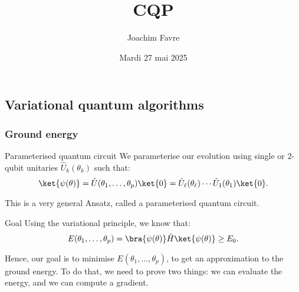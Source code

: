 \documentclass[a4paper]{article}
\title{CQP}
\author{Joachim Favre}
\date{Mardi 27 mai 2025}
\begin{document}
\maketitle


\subsection{Variational quantum algorithms}

\subsubsection{Ground energy}

\begin{parag}{Parameterised quantum circuit}
    We parameterise our evolution using single or 2-qubit unitaries $\hat{U}_k\left(\theta_k\right)$ such that: 
    \[\ket{\psi\left(\theta\right)} = \hat{U}\left(\theta_1, \ldots, \theta_p\right) \ket{0} = \hat{U}_{\ell}\left(\theta_{\ell}\right) \cdots \hat{U}_1\left(\theta_1\right) \ket{0}.\]

    This is a very general Ansatz, called a parameterised quantum circuit.
\end{parag}

\begin{parag}{Goal}
    Using the variational principle, we know that: 
    \[E\left(\theta_1, \ldots, \theta_p\right) = \bra{\psi\left(\theta\right)} \hat{H} \ket{\psi\left(\theta\right)} \geq E_0.\]

    Hence, our goal is to minimise $E\left(\theta_1, \ldots, \theta_p\right)$, to get an approximation to the ground energy. To do that, we need to prove two things: we can evaluate the energy, and we can compute a gradient.
\end{parag}
\end{document}
